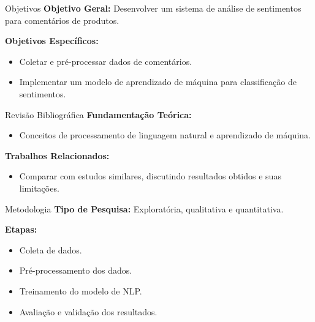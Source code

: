 \documentclass{beamer}
\begin{document}
\begin{frame}{Objetivos}
    \textbf{Objetivo Geral:} Desenvolver um sistema de análise de sentimentos para comentários de produtos.
    
    \vspace{0.5cm}
    \textbf{Objetivos Específicos:}
    \begin{itemize}
        \item Coletar e pré-processar dados de comentários.
        \item Implementar um modelo de aprendizado de máquina para classificação de sentimentos.
    \end{itemize}
\end{frame}

\begin{frame}{Revisão Bibliográfica}
    \textbf{Fundamentação Teórica:}
    \begin{itemize}
        \item Conceitos de processamento de linguagem natural e aprendizado de máquina.
    \end{itemize}
    
    \vspace{0.5cm}
    \textbf{Trabalhos Relacionados:}
    \begin{itemize}
        \item Comparar com estudos similares, discutindo resultados obtidos e suas limitações.
    \end{itemize}
\end{frame}

\begin{frame}{Metodologia}
    \textbf{Tipo de Pesquisa:} Exploratória, qualitativa e quantitativa.
    
    \vspace{0.5cm}
    \textbf{Etapas:}
    \begin{itemize}
        \item Coleta de dados.
        \item Pré-processamento dos dados.
        \item Treinamento do modelo de NLP.
        \item Avaliação e validação dos resultados.
    \end{itemize}
\end{frame}
\end{document}
